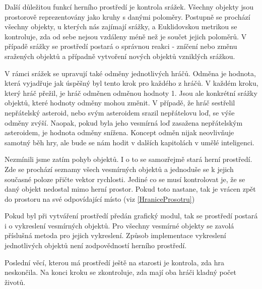 \par
Další důležitou funkcí herního prostředí je kontrola srážek. Všechny objekty jsou prostorově reprezentovány jako kruhy s danými poloměry.
Postupně se prochází všechny objekty, u kterých nás zajímají srážky, a Euklidovskou metrikou se kontroluje, zda od sebe nejsou vzdáleny méně než je součet jejich poloměrů.
V případě srážky se prostředí postará o správnou reakci - zníčení nebo změnu sražených objektů a případně vytvoření nových objektů vzniklých srážkou.

\par
V rámci srážek se upravují také odměny jednotlivých hráčů. Odměna je hodnota, která vyjadřuje jak úspěšný byl tento krok pro každého z hráčů.
V každém kroku, který hráč přežil, je hráč odměnen odměnou hodnoty 1. Jsou ale konkrétní srážky objektů, které hodnoty odměny mohou změnit.
V případě, že hráč sestřelil nepřátelský asteroid, nebo svým asteroidem srazil nepřátelovu loď, se výše odměny zvýší. 
Naopak, pokud byla jeho vesmírná loď zasažena nepřátelským asteroidem, je hodnota odměny snížena. 
Koncept odměn nijak neovlivňuje samotný běh hry, ale bude se nám hodit v dalších kapitolách v umělé inteligenci.

\par
Nezmínili jsme zatím pohyb objektů. I o to se samozřejmě stará herní prostředí. 
Zde se prochází seznamy všech vesmírných objektů a jednoduše se k jejich současné poloze přičte vektor rychlosti.
Jediné co se musí kontrolovat je, že se daný objekt nedostal mimo herní prostor. Pokud toto nastane, tak je vrácen zpět do prostoru na své odpovídající místo
(viz \ref{HraniceProsotru})

\par
Pokud byl při vytváření prostředí předán grafický modul, tak se prostředí postará i o vykreslení vesmírných objektů.
Pro všechny vesmírné objekty se zavolá příslušná metoda pro jejich vykreslení. 
Způsob implementace vykreslení jednotlivých objektů není zodpovědností herního prostředí.

\par
Poslední věcí, kterou má prostředí ještě na starosti je kontrola, zda hra neskončila. Na konci kroku se zkontroluje, zda mají oba hráči kladný počet životů.

\par




